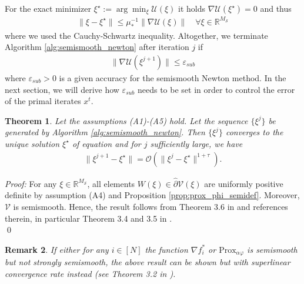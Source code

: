 \documentclass[12pt,a4paper,twoside]{article}
\makeatletter
\renewcommand*{\eqref}[1]{%
	\hyperref[{#1}]{\textup{\tagform@{\ref*{#1}}}}%
}
\theoremstyle{plain}
\newtheorem{thm}{Theorem}
\newtheorem{rem}[thm]{Remark}
\theoremstyle{note}
\numberwithin{thm}{section}
\newcommand{\proxfun}[1]{\text{Prox}_{#1}}
\let\temp\phi
\let\phi\varphi
\let\varphi\temp
\let\epsilon\varepsilon
\makeatother
\begin{document}
	For the exact minimizer $\xi^\star := \arg \min_{\xi} \mathcal{U}(\xi)$ it holds $\nabla\mathcal{U}(\xi^\star)=0$ and thus
	\begin{align*}
	\|\xi - \xi^\star \| \leq \mu_\ast^{-1}\|\nabla\mathcal{U}(\xi)\| \quad \forall \xi \in \mathbb{R}^{M_\mathcal{S}}
	\end{align*}
	where we used the Cauchy-Schwartz inequality. Altogether, we terminate Algorithm \ref{alg:semismooth_newton} after iteration $j$  if
	\begin{align}
		\|\nabla\mathcal{U}(\xi^{j+1})\| \leq \epsilon_{sub}
	\end{align}
	where $\epsilon_{sub} >0 $ is a given accuracy for the semismooth Newton method. In the next section, we will derive how $\epsilon_{sub}$ needs to be set in order to control the error of the primal iterates $x^t$. 
	
	\vspace{10mm}
	\begin{thm}
		Let the assumptions (A1)-(A5) hold. Let the sequence $\{\xi^j\}$ be generated by Algorithm \ref{alg:semismooth_newton}. Then $\{\xi^j\}$ converges to the unique solution $\xi^\star$ of equation \eqref{eqn:nonlinear_system_stochastic} and for $j$ sufficiently large, we have
		\begin{align*}
			\|\xi^{j+1} - \xi^\star\| = \mathcal{O}(\|\xi^{j} - \xi^\star\|^{1+\tau}).
		\end{align*}
	\end{thm}
	\textit{Proof:} For any $\xi \in \mathbb{R}^{M_\mathcal{S}}$, all elements $W(\xi) \in \hat{\partial} \mathcal{V}(\xi)$ are uniformly positive definite by assumption (A4) and Proposition \ref{prop:prox_phi_semidef}. Moreover, $\mathcal{V}$ is semismooth. Hence, the result follows from Theorem 3.6 in \cite{Li2018} and references therein, in particular Theorem 3.4 and 3.5 in \cite{Zhao2010}.\\
	\qed
	
	\vspace{5mm}
	\begin{rem}
		If either for any $i \in [N]$ the function $\nabla f_i^\ast$ or $\proxfun{\alpha \phi}$ is semismooth but not strongly semismooth, the above result can be shown but with superlinear convergence rate instead (see Theorem 3.2 in \cite{Pang1995}). 
	\end{rem}
\end{document}
